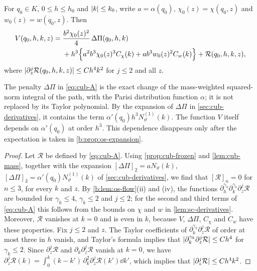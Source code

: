 \begin{proposition}\label{prop:cub-pointwise}
For $q_0\in K$, $0\le h\le h_0$ and $\lvert k\rvert\le k_0$, write $a=\alpha(q_0)$,
$\chi_0(z)=\chi(q_0,z)$ and $w_0(z)=w(q_0,z)$. Then
\begin{equation}\label{eq:cub-A}
\begin{aligned}
 V(q_0,h,k,z)={}&\frac{b^2\chi_0(z)^2}4\,\Delta\Pi(q_0,h,k)\\
 &+h^3\Bigl\{a^2b^3\chi_0(z)^3C_\chi(k)+ab^3w_0(z)^2C_w(k)\Bigr\}+\mathcal R(q_0,h,k,z),
\end{aligned}
\end{equation}
where $\lvert \partial_z^j\mathcal R(q_0,h,k,z)\rvert\le Ch^4k^2$ for $j\le2$ and all $z$.
\end{proposition}

The penalty $\Delta\Pi$ in \eqref{eq:cub-A} is the exact change of the
mass-weighted squared-norm integral of the path, with the Parisi distribution
function $\alpha$; it
is not replaced by its Taylor polynomial. By the expansion of $\Delta\Pi$ in
\cref{sec:cub-derivatives}, it contains the term
$\alpha'(q_0)h^3N^{(1)}_\vartheta(k)$. The function $V$ itself depends on
$\alpha'(q_0)$ at order $h^3$. This dependence disappears only after the
expectation is taken in \cref{b:prop:os-expansion}.

\begin{proof}
Let $\mathcal R$ be defined by \eqref{eq:cub-A}. Using \cref{prop:cub-frozen} and
\cref{lem:cub-mass}, together with the expansion $[\Delta\Pi]_2=aN_\vartheta(k)$,
$[\Delta\Pi]_3=\alpha'(q_0)N^{(1)}_\vartheta(k)$ of \cref{sec:cub-derivatives},
we find that $[\mathcal R]_n=0$ for $n\le3$, for every $k$ and $z$. By
\cref{b:lem:os-flow}(ii) and (iv), the functions $\partial_h^{\gamma_h}\partial_k^{\gamma_k}
\partial_z^j\mathcal R$ are bounded for $\gamma_h\le4$, $\gamma_k\le2$ and $j\le2$; for the
second and third terms of \eqref{eq:cub-A} this follows from the bounds on
$\chi$ and $w$ in \cref{lem:sc-derivatives}. Moreover, $\mathcal R$ vanishes at
$k=0$ and is even in $k$, because $V$, $\Delta\Pi$, $C_\chi$ and $C_w$ have these
properties. Fix $j\le2$ and $z$. The Taylor coefficients of
$\partial_k^{\gamma_k}\partial_z^j\mathcal R$ of order at most three in $h$ vanish, and
Taylor's formula implies that $\lvert \partial_k^{\gamma_k}\partial_z^j\mathcal R\rvert\le Ch^4$
for $\gamma_k\le2$. Since $\partial_z^j\mathcal R$ and $\partial_k\partial_z^j\mathcal R$
vanish at $k=0$, we have
$\partial_z^j\mathcal R(k)=\int_0^k(k-k')\,\partial_k^2\partial_z^j\mathcal
R(k')\dd k'$, which implies that $\lvert \partial_z^j\mathcal R\rvert\le Ch^4k^2$.
\end{proof}

